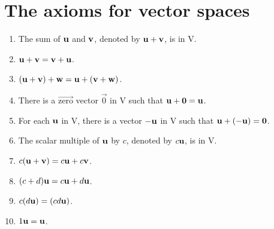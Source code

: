 \section{The axioms for vector spaces}

\begin{enumerate}
 \item The sum of $\mathbf{u}$ and $\mathbf{v}$, denoted by $\mathbf{u} + \mathbf{v}$, is in V.
 \item $\mathbf{u} + \mathbf{v} = \mathbf{v} + \mathbf{u}$.
 \item $(\mathbf{u} + \mathbf{v}) + \mathbf{w} = \mathbf{u} + (\mathbf{v} + \mathbf{w})$.
 \item There is a $\vec{\text{zero}}$ vector $\vec{0}$ in V such that $\mathbf{u} + \mathbf{0} = \mathbf{u}$.
 \item For each $\mathbf{u}$ in V, there is a vector $-\mathbf{u}$ in V such that $\mathbf{u} + (-\mathbf{u}) = \mathbf{0}$.
 \item The scalar multiple of $\mathbf{u}$ by $c$, denoted by $c\mathbf{u}$, is in V.
 \item $c(\mathbf{u} + \mathbf{v}) = c\mathbf{u} + c\mathbf{v}$.
 \item $(c + d)\mathbf{u} = c\mathbf{u} + d\mathbf{u}$.
 \item $c(d\mathbf{u}) = (cd\mathbf{u})$.
 \item $1\mathbf{u} = \mathbf{u}$.
\end{enumerate}


